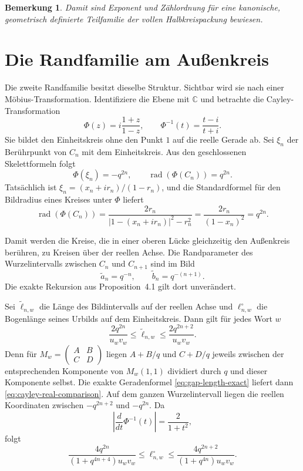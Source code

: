\documentclass[11pt,a4paper]{article}
\newtheorem{remark}{Bemerkung}[section]
\begin{document}
\begin{remark}
Damit sind Exponent und Zählordnung für eine kanonische, geometrisch
definierte Teilfamilie der vollen Halbkreispackung bewiesen.
\end{remark}

\section{Die Randfamilie am Außenkreis}

Die zweite Randfamilie besitzt dieselbe Struktur. Sichtbar wird sie nach
einer Möbius-Transformation. Identifiziere die Ebene mit $\mathbb C$ und
betrachte die Cayley-Transformation
\[
 \Phi(z)=i\frac{1+z}{1-z},
 \qquad
 \Phi^{-1}(t)=\frac{t-i}{t+i}.
\]
Sie bildet den Einheitskreis ohne den Punkt $1$ auf die reelle Gerade ab.
Sei $\xi_n$ der Berührpunkt von $C_n$ mit dem Einheitskreis. Aus den
geschlossenen Skelettformeln folgt
\begin{equation}\label{eq:cayley-skeleton}
 \Phi(\xi_n)=-q^{2n},
 \qquad
 \operatorname{rad}(\Phi(C_n))=q^{2n}.
\end{equation}
Tatsächlich ist $\xi_n=(x_n+ir_n)/(1-r_n)$, und die Standardformel für den
Bildradius eines Kreises unter $\Phi$ liefert
\[
 \operatorname{rad}(\Phi(C_n))
 =\frac{2r_n}{|1-(x_n+ir_n)|^2-r_n^2}
 =\frac{2r_n}{(1-x_n)^2}=q^{2n}.
\]

Damit werden die Kreise, die in einer oberen Lücke gleichzeitig den
Außenkreis berühren, zu Kreisen über der reellen Achse. Die Randparameter
des Wurzelintervalls zwischen $C_n$ und $C_{n+1}$ sind im Bild
\[
 \widetilde a_n=q^{-n},
 \qquad
 \widetilde b_n=q^{-(n+1)}.
\]
Die exakte Rekursion aus Proposition~4.1 gilt dort unverändert.

Sei $\widetilde\ell_{n,w}$ die Länge des Bildintervalls auf der reellen
Achse und $\ell^{\circ}_{n,w}$ die Bogenlänge seines Urbilds auf dem
Einheitskreis. Dann gilt für jedes Wort $w$
\begin{equation}\label{eq:cayley-real-comparison}
 \frac{2q^{2n}}{u_wv_w}
 \le \widetilde\ell_{n,w}\le
 \frac{2q^{2n+2}}{u_wv_w}.
\end{equation}
Denn für $M_w=\left(\begin{smallmatrix}A&B\\C&D\end{smallmatrix}\right)$
liegen $A+B/q$ und $C+D/q$ jeweils zwischen der entsprechenden
Komponente von $M_w(1,1)$ dividiert durch $q$ und dieser Komponente selbst.
Die exakte Geradenformel \eqref{eq:gap-length-exact} liefert dann
\eqref{eq:cayley-real-comparison}.
Auf dem ganzen Wurzelintervall liegen die reellen Koordinaten zwischen
$-q^{2n+2}$ und $-q^{2n}$. Da
\[
 \left|\frac{d}{dt}\Phi^{-1}(t)\right|=\frac{2}{1+t^2},
\]
folgt
\begin{equation}\label{eq:outer-arc-comparison}
 \frac{4q^{2n}}{(1+q^{4n+4})u_wv_w}
 \le \ell^{\circ}_{n,w}\le
 \frac{4q^{2n+2}}{(1+q^{4n})u_wv_w}.
\end{equation}
\end{document}

